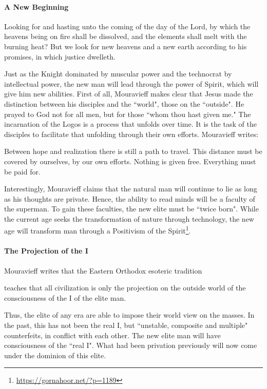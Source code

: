 \paragraph{A New Beginning}
\begin{quotex}
Looking for and hasting unto the coming of the day of the Lord, by which the heavens being on fire shall be dissolved, and the elements shall melt with the burning heat? But we look for new heavens and a new earth according to his promises, in which justice dwelleth. 

\end{quotex}
Just as the Knight dominated by muscular power and the technocrat by intellectual power, the new man will lead through the power of Spirit, which will give him new abilities. First of all, Mouravieff makes clear that Jesus made the distinction between his disciples and the ``world", those on the ``outside". He prayed to God not for all men, but for those ``whom thou hast given me." The incarnation of the Logos is a process that unfolds over time. It is the task of the disciples to facilitate that unfolding through their own efforts. Mouravieff writes:

\begin{quotex}
Between hope and realization there is still a path to travel. This distance must be covered by ourselves, by our own efforts. Nothing is given free. Everything must be paid for.

\end{quotex}
Interestingly, Mouravieff claims that the natural man will continue to lie as long as his thoughts are private. Hence, the ability to read minds will be a faculty of the superman. To gain these faculties, the new elite must be ``twice born". While the current age seeks the transformation of nature through technology, the new age will transform man through a Positivism of the Spirit\footnote{\url{https://gornahoor.net/?p=1189}}.

\paragraph{The Projection of the I}
Mouravieff writes that the Eastern Orthodox esoteric tradition 

\begin{quotex}
teaches that all civilization is only the projection on the outside world of the consciousness of the I of the elite man.

\end{quotex}
Thus, the elite of any era are able to impose their world view on the masses. In the past, this has not been the real I, but ``unstable, composite and multiple" counterfeits, in conflict with each other. The new elite man will have consciousness of the ``real I". What had been privation previously will now come under the dominion of this elite.

